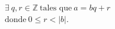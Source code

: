 \documentclass[preview]{standalone}
\begin{document}
\begin{align*}
\exists\ q, r \in \mathbb{Z} \ \text{tales que} \ a = bq + r\\ \text{donde}\ 0 \leq r < |b|.
\end{align*}
\end{document}
